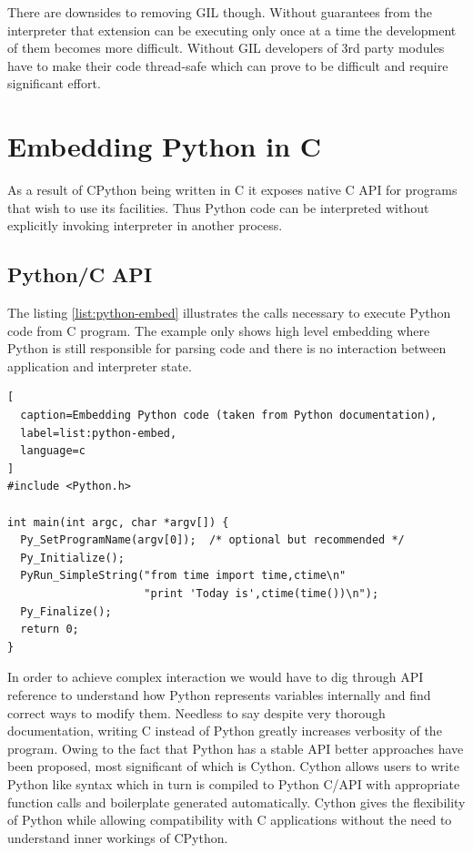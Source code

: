 \documentclass[12pt, a4paper]{report}
\begin{document}
There are downsides to removing GIL though. Without guarantees from
the interpreter that extension can be executing only once at
a time the development of them becomes more difficult. Without GIL
developers of 3rd party modules have to make their code thread-safe
which can prove to be difficult and require significant effort.

\section{Embedding Python in C}\label{sec:python-embedding}
As a result of CPython being written in C it exposes native C API for
programs that wish to use its facilities. Thus Python code can be
interpreted without explicitly invoking interpreter in another process.

\subsection{Python/C API}\label{subsec:python-capi}
The listing \ref{list:python-embed} illustrates the calls necessary
to execute Python code from C program. The example only shows
high level embedding where Python is still responsible for parsing
code and there is no interaction between application and interpreter
state.

\begin{lstlisting}[
  caption=Embedding Python code (taken from Python documentation),
  label=list:python-embed,
  language=c
]
#include <Python.h>

int main(int argc, char *argv[]) {
  Py_SetProgramName(argv[0]);  /* optional but recommended */
  Py_Initialize();
  PyRun_SimpleString("from time import time,ctime\n"
                     "print 'Today is',ctime(time())\n");
  Py_Finalize();
  return 0;
}
\end{lstlisting}

In order to achieve complex interaction we would have to dig
through API reference to understand how Python represents variables
internally and find correct ways to modify them. Needless to say
despite very thorough documentation, writing C instead of Python
greatly increases verbosity of the program. Owing to the fact
that Python has a stable API better approaches have been proposed,
most significant of which is Cython. Cython allows users to write
Python like syntax which in turn is compiled to Python C/API
with appropriate function calls and boilerplate generated
automatically. Cython gives the flexibility of Python while allowing
compatibility with C applications without the need to understand
inner workings of CPython.
\end{document}
